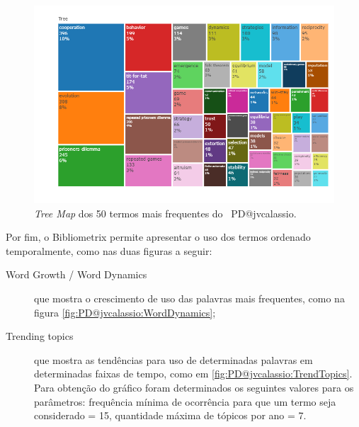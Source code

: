 \begin{figure}
    \centering
    \includegraphics[width=1\textwidth]{exploratory-data-analysis/jvcalassio/PesqBibliogr/PrisonersDilemma/WoS-20221201/Dataset/TreeMap.png}
    \caption{\textit{Tree Map} dos 50 termos mais frequentes do \dataset\ PD@jvcalassio.}
    \label{fig:PD@jvcalassio:TreeMap}
\end{figure}

Por fim, o Bibliometrix permite apresentar o uso dos termos ordenado temporalmente, como nas duas figuras a seguir:

\begin{description}
    \item [Word Growth / Word Dynamics] que mostra o crescimento de uso das palavras mais frequentes, como na figura \ref{fig:PD@jvcalassio:WordDynamics};
    \item [Trending topics] que mostra as tendências para uso de determinadas palavras em determinadas faixas de tempo, como em \ref{fig:PD@jvcalassio:TrendTopics}. Para obtenção do gráfico foram determinados os seguintes valores para os parâmetros: frequência mínima de ocorrência para que um termo seja considerado = 15, quantidade máxima de tópicos por ano = 7.
\end{description}

